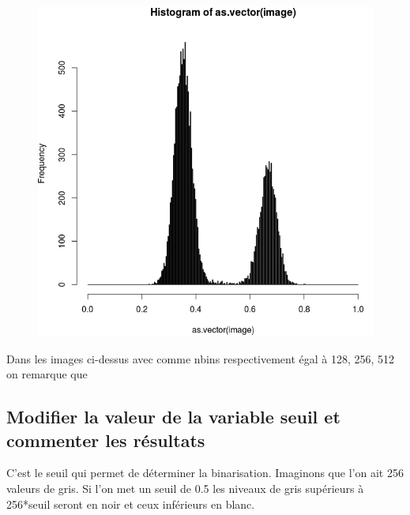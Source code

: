 \documentclass[a4paper,12pt]{report}
\begin{document}
\begin{figure}[!ht]
	\includegraphics[scale=0.25]{image/512.png}
\end{figure}

Dans les images ci-dessus avec comme nbins respectivement égal  à 128, 256, 512 on remarque que 

\subsection*{Modifier la valeur de la variable seuil et commenter les résultats}

C'est le seuil qui permet de déterminer la binarisation. Imaginons que l'on ait 256 valeurs de gris. Si l'on met un seuil de 0.5 les niveaux de gris supérieurs à 256*seuil seront en noir et ceux inférieurs en blanc.
\end{document}
